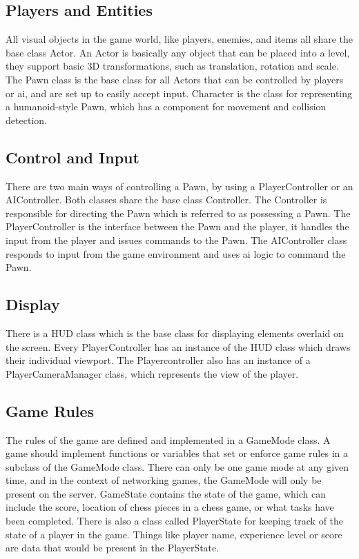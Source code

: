 \subsection{Players and Entities}
All visual objects in the game world, like players, enemies, and items all share the base class Actor. An Actor is basically any object that can be placed into a level, they support basic 3D transformations, such as translation, rotation and scale. The Pawn class is the base class for all Actors that can be controlled by players or \gls{ai}, and are set up to easily accept input. Character is the class for representing a humanoid-style Pawn, which has a component for movement and collision detection.

\subsection{Control and Input}
There are two main ways of controlling a Pawn, by using a PlayerController or an AIController. Both classes share the base class Controller. The Controller is responsible for directing the Pawn which is referred to as possessing a Pawn. The PlayerController is the interface between the Pawn and the player, it handles the input from the player and issues commands to the Pawn. The AIController class responds to input from the game environment and uses \gls{ai} logic to command the Pawn.

\subsection{Display}
There is a HUD class which is the base class for displaying elements overlaid on the screen. Every PlayerController has an instance of the HUD class which draws their individual viewport. The Playercontroller also has an instance of a PlayerCameraManager class, which represents the view of the player.

\subsection{Game Rules}
The rules of the game are defined and implemented in a GameMode class. A game should implement functions or variables that set or enforce game rules in a subclass of the GameMode class. There can only be one game mode at any given time, and in the context of networking games, the GameMode will only be present on the server. GameState contains the state of the game, which can include the score, location of chess pieces in a chess game, or what tasks have been completed. There is also a class called PlayerState for keeping track of the state of a player in the game. Things like player name, experience level or score are data that would be present in the PlayerState.


